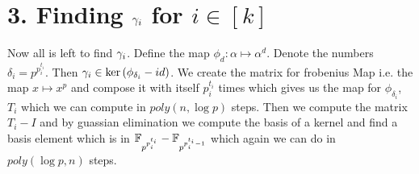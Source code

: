 \documentclass[a4paper, 11pt]{article}
\begin{document}
{	\section*{3. Finding $\gamma_i$ for $i\in[k]$}
	Now all is left to find $\gamma_i$. Define the map $\phi_d:\alpha\mapsto \alpha^d$. Denote the numbers $\delta_i=p^{p_i^{t_i}}$. Then $\gamma_i\in \ker\left(\phi_{\delta_i}-id\right)$. We create the matrix for frobenius Map i.e. the map $x\mapsto x^p$ and compose it with itself $p_i^{t_i}$ times which gives us the map for $\phi_{\delta_i}$, $T_i$ which we can compute in $poly(n,\log p)$ steps. Then we compute the matrix $T_i-I$ and by guassian elimination we compute the basis of a kernel and find a basis element which is in $\mathbb{F}_{p^{p_i^{t_i}}}-\mathbb{F}_{p^{p_i^{t_i}-1}}$ which again we can do in $poly(\log p, n)$ steps. 
}
\end{document}
